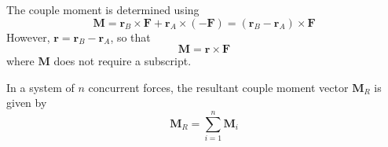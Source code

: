 \documentclass{article}
\begin{document}
The couple moment is determined using
\begin{equation*}
    \symbf{M} = \symbf{r}_B \times \symbf{F} + \symbf{r}_A \times \left( -\symbf{F} \right) = \left( \symbf{r}_B - \symbf{r}_A \right) \times \symbf{F}
\end{equation*}
However, \(\symbf{r} = \symbf{r}_B - \symbf{r}_A\), so that
\begin{equation*}
    \symbf{M} = \symbf{r} \times \symbf{F}
\end{equation*}
where \(\symbf{M}\) does not require a subscript.
\begin{definition}
    In a system of \(n\) concurrent forces, the resultant couple moment vector \(\symbf{M}_R\) is given by
    \begin{equation*}
        \symbf{M}_R = \sum_{i = 1}^n \symbf{M}_i
    \end{equation*}
\end{definition}
\end{document}
